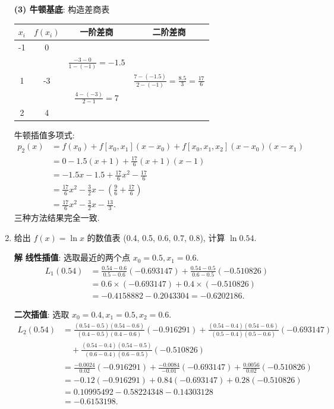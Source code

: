 \documentclass[a4paper,11pt]{ctexart}
\newcommand{\sol}{\par\noindent\textbf{解}\quad}
\begin{document}
\begin{enumerate}[label=\textbf{2-\arabic*.}, leftmargin=*]
    \textbf{(3) 牛顿基底}: 构造差商表
    \begin{center}
    \begin{tabular}{c|ccc}
    $x_i$ & $f(x_i)$ & 一阶差商 & 二阶差商 \\
    \hline
    -1 & 0 & & \\
       &   & $\frac{-3-0}{1-(-1)} = -1.5$ & \\
    1  & -3 & & $\frac{7 - (-1.5)}{2-(-1)} = \frac{8.5}{3} = \frac{17}{6}$ \\
       &   & $\frac{4-(-3)}{2-1} = 7$ & \\
    2  & 4 & & 
    \end{tabular}
    \end{center}
    牛顿插值多项式:
    \begin{align*}
    p_2(x) &= f(x_0) + f[x_0, x_1](x-x_0) + f[x_0, x_1, x_2](x-x_0)(x-x_1) \\
           &= 0 - 1.5(x+1) + \frac{17}{6}(x+1)(x-1) \\
           &= -1.5x - 1.5 + \frac{17}{6}x^2 - \frac{17}{6} \\
           &= \frac{17}{6}x^2 - \frac{3}{2}x - (\frac{9}{6} + \frac{17}{6}) \\
           &= \frac{17}{6}x^2 - \frac{3}{2}x - \frac{13}{3}.
    \end{align*}
    三种方法结果完全一致.

    \item 给出 $f(x) = \ln x$ 的数值表 (0.4, 0.5, 0.6, 0.7, 0.8), 计算 $\ln 0.54$.
    
    \sol 
    \textbf{线性插值}: 选取最近的两个点 $x_0=0.5, x_1=0.6$.
    \begin{align*}
    L_1(0.54) &= \frac{0.54-0.6}{0.5-0.6}(-0.693147) + \frac{0.54-0.5}{0.6-0.5}(-0.510826) \\
              &= 0.6 \times (-0.693147) + 0.4 \times (-0.510826) \\
              &= -0.4158882 - 0.2043304 = -0.6202186.
    \end{align*}
    
    \textbf{二次插值}: 选取 $x_0=0.4, x_1=0.5, x_2=0.6$.
    \begin{align*}
    L_2(0.54) &= \frac{(0.54-0.5)(0.54-0.6)}{(0.4-0.5)(0.4-0.6)}(-0.916291) + \frac{(0.54-0.4)(0.54-0.6)}{(0.5-0.4)(0.5-0.6)}(-0.693147) \\
              &\quad + \frac{(0.54-0.4)(0.54-0.5)}{(0.6-0.4)(0.6-0.5)}(-0.510826) \\
              &= \frac{-0.0024}{0.02}(-0.916291) + \frac{-0.0084}{-0.01}(-0.693147) + \frac{0.0056}{0.02}(-0.510826) \\
              &= -0.12(-0.916291) + 0.84(-0.693147) + 0.28(-0.510826) \\
              &= 0.10995492 - 0.58224348 - 0.14303128 \\
              &= -0.6153198.
    \end{align*}


\end{enumerate}
\end{document}

